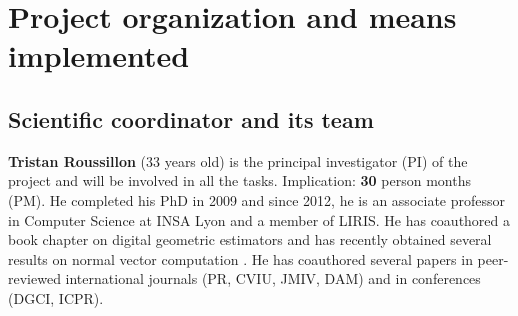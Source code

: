 \section{Project organization and means implemented}
\label{sec:org}

\subsection{Scientific coordinator and its team}


\textbf{Tristan Roussillon} (33 years old) is the principal investigator (PI) of the project
and will be involved in all the tasks. Implication: \textbf{30} person months (PM). 
He completed his PhD in 2009 and since 2012, he is an associate professor in Computer Science at INSA Lyon
and a member of LIRIS. 
He has coauthored a book chapter on digital geometric estimators \cite{Coeurjolly2012} and
has recently obtained several results on normal vector computation \cite{LPRTCS2016,LPRDGCI2016,LPRJMIV2017}.    
He has coauthored several papers in peer-reviewed international journals (\eg PR, CVIU, JMIV, DAM) 
and in conferences (\eg DGCI, ICPR).

